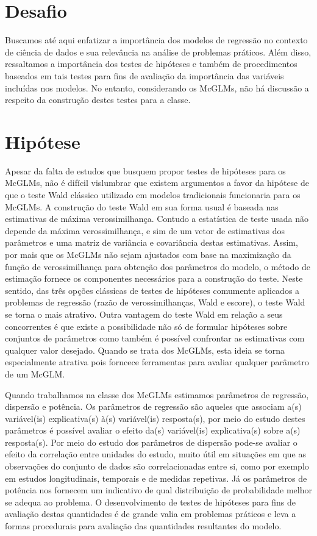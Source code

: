 \section{Desafio}

Buscamos até aqui enfatizar a importância dos modelos de regressão no contexto de ciência de dados e sua relevância na análise de problemas práticos. Além disso, ressaltamos a importância dos testes de hipóteses e também de procedimentos baseados em tais testes para fins de avaliação da importância das variáveis incluídas nos modelos. No entanto, considerando os McGLMs, não há discussão a respeito da construção destes testes para a classe.


\section{Hipótese}

Apesar da falta de estudos que busquem propor testes de hipóteses para os McGLMs, não é difícil vislumbrar que existem argumentos a favor da hipótese de que o teste Wald clássico utilizado em modelos tradicionais funcionaria para os McGLMs. A construção do teste Wald em sua forma usual é baseada nas estimativas de máxima verossimilhança. Contudo a estatística de teste usada não depende da máxima verossimilhança, e sim de um vetor de estimativas dos parâmetros e uma matriz de variância e covariância destas estimativas. Assim, por mais que os McGLMs não sejam ajustados com base na maximização da função de verossimilhança para obtenção dos parâmetros do modelo, o método de estimação fornece os componentes necessários para a construção do teste. Neste sentido, das três opções clássicas de testes de hipóteses comumente aplicados a problemas de regressão (razão de verossimilhanças, Wald e escore), o teste Wald se torna o mais atrativo. Outra vantagem do teste Wald em relação a seus concorrentes é que existe a possibilidade não só de formular hipóteses sobre conjuntos de parâmetros como também é possível confrontar as estimativas com qualquer valor desejado. Quando se trata dos McGLMs, esta ideia se torna especialmente atrativa pois forncece ferramentas para avaliar qualquer parâmetro de um McGLM. 

Quando trabalhamos na classe dos McGLMs estimamos parâmetros de regressão, dispersão e potência. Os parâmetros de regressão são aqueles que associam a(s) variável(is) explicativa(s) à(s) variável(is) resposta(s), por meio do estudo destes parâmetros é possível avaliar o efeito da(s) variável(is) explicativa(s) sobre a(s) resposta(s). Por meio do estudo dos parâmetros de dispersão pode-se avaliar o efeito da correlação entre unidades do estudo, muito útil em situações em que as observações do conjunto de dados são correlacionadas entre si, como por exemplo em estudos longitudinais, temporais e de medidas repetivas. Já os parâmetros de potência nos fornecem um indicativo de qual distribuição de probabilidade melhor se adequa ao problema. O desenvolvimento de testes de hipóteses para fins de avaliação destas quantidades é de grande valia em problemas práticos e leva a formas procedurais para avaliação das quantidades resultantes do modelo.

